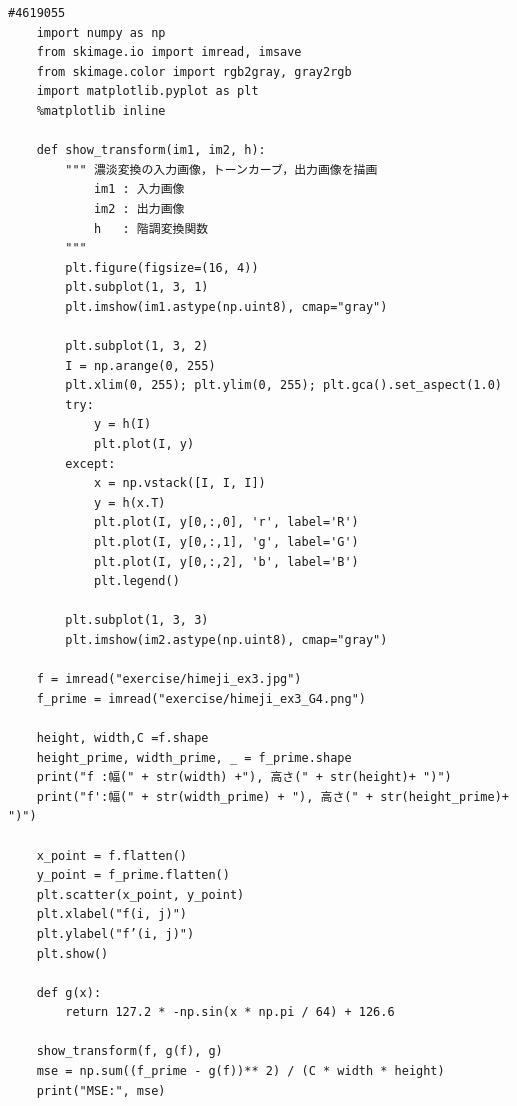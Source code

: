 \documentclass[12pt]{jarticle}
\begin{document}
\begin{lstlisting}[style = py,caption=kadai3]
    #4619055
    import numpy as np
    from skimage.io import imread, imsave
    from skimage.color import rgb2gray, gray2rgb
    import matplotlib.pyplot as plt
    %matplotlib inline
    
    def show_transform(im1, im2, h):
        """ 濃淡変換の入力画像，トーンカーブ，出力画像を描画
            im1 : 入力画像
            im2 : 出力画像
            h   : 階調変換関数
        """
        plt.figure(figsize=(16, 4))
        plt.subplot(1, 3, 1)
        plt.imshow(im1.astype(np.uint8), cmap="gray")
        
        plt.subplot(1, 3, 2)
        I = np.arange(0, 255)
        plt.xlim(0, 255); plt.ylim(0, 255); plt.gca().set_aspect(1.0)
        try:
            y = h(I)
            plt.plot(I, y)
        except:
            x = np.vstack([I, I, I])
            y = h(x.T)
            plt.plot(I, y[0,:,0], 'r', label='R')
            plt.plot(I, y[0,:,1], 'g', label='G')
            plt.plot(I, y[0,:,2], 'b', label='B')
            plt.legend()
       
        plt.subplot(1, 3, 3)
        plt.imshow(im2.astype(np.uint8), cmap="gray")
        
    f = imread("exercise/himeji_ex3.jpg")
    f_prime = imread("exercise/himeji_ex3_G4.png")
    
    height, width,C =f.shape
    height_prime, width_prime, _ = f_prime.shape
    print("f :幅(" + str(width) +"), 高さ(" + str(height)+ ")")
    print("f':幅(" + str(width_prime) + "), 高さ(" + str(height_prime)+ ")")
    
    x_point = f.flatten()
    y_point = f_prime.flatten()
    plt.scatter(x_point, y_point)
    plt.xlabel("f(i, j)")
    plt.ylabel("f’(i, j)")
    plt.show()
    
    def g(x):
        return 127.2 * -np.sin(x * np.pi / 64) + 126.6
    
    show_transform(f, g(f), g)
    mse = np.sum((f_prime - g(f))** 2) / (C * width * height)
    print("MSE:", mse)
\end{lstlisting}

\end{document}
